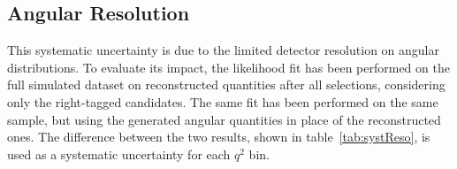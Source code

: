 



\clearpage


\subsection{Angular Resolution}
\label{sec:sys-angres}

This systematic uncertainty is due to the limited detector resolution on angular distributions.
To evaluate its impact, the likelihood fit has been performed on the full simulated dataset on reconstructed quantities after all selections, considering only the right-tagged candidates.
The same fit has been performed on the same sample, but using the generated angular quantities in place of the reconstructed ones.
The difference between the two results, shown in table~\ref{tab:systReso}, is used as a systematic uncertainty for each $q^2$ bin.

